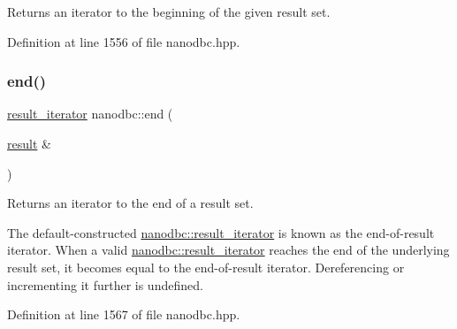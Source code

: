Returns an iterator to the beginning of the given result set. 



Definition at line 1556 of file nanodbc.\+hpp.

\mbox{\label{group__mainc_ga91df79a3401b5afd4ec109101737b05b}} 
\subsubsection{\texorpdfstring{end()}{end()}}
{\footnotesize\ttfamily \mbox{\hyperlink{classnanodbc_1_1result__iterator}{result\+\_\+iterator}} nanodbc\+::end (\begin{DoxyParamCaption}\item[{\mbox{\hyperlink{classnanodbc_1_1result}{result}} \&}]{ }\end{DoxyParamCaption})\hspace{0.3cm}{\ttfamily [inline]}}



Returns an iterator to the end of a result set. 

The default-\/constructed {\ttfamily \mbox{\hyperlink{classnanodbc_1_1result__iterator}{nanodbc\+::result\+\_\+iterator}}} is known as the end-\/of-\/result iterator. When a valid {\ttfamily \mbox{\hyperlink{classnanodbc_1_1result__iterator}{nanodbc\+::result\+\_\+iterator}}} reaches the end of the underlying result set, it becomes equal to the end-\/of-\/result iterator. Dereferencing or incrementing it further is undefined. 

Definition at line 1567 of file nanodbc.\+hpp.

